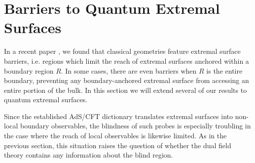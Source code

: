 \documentclass[12pt]{article}
\theoremstyle{remark}
\numberwithin{equation}{section}
\numberwithin{equation}{section}
\begin{document}
\section{Barriers to Quantum Extremal Surfaces}\label{Barriers}
%
In a recent paper \cite{EngelhardtWall}, we found that classical geometries feature extremal surface barriers, i.e. regions which limit the reach of extremal surfaces anchored within a boundary region $R$.  In some cases, there are even barriers when $R$ is the entire boundary, preventing any boundary-anchored extremal surface from accessing an entire portion of the bulk.  In this section we will extend several of our results to quantum extremal surfaces.

Since the established AdS/CFT dictionary translates extremal surfaces into non-local boundary observables, the blindness of such probes is especially troubling in the case where the reach of local observables is likewise limited.  As in the previous section, this situation raises the question of whether the dual field theory contains any information about the blind region.

\end{document}
